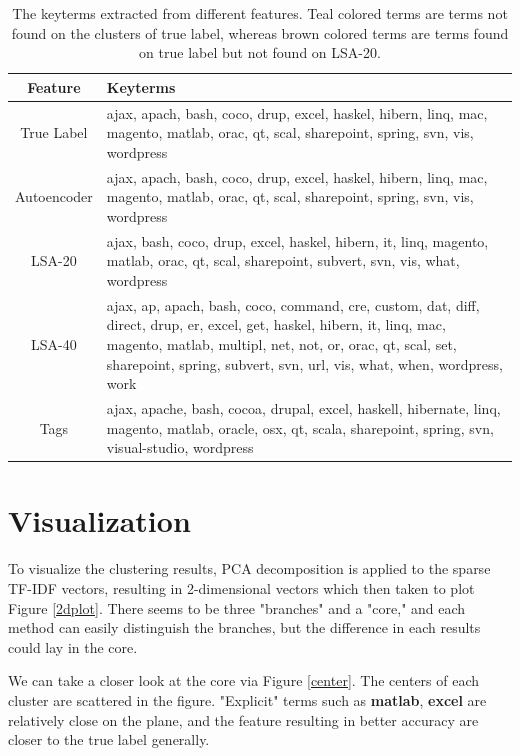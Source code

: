 \documentclass[12pt]{article}
\begin{document}
\begin{table}
  \label{keyterm}
  \noindent
  \newcommand{\diff}[1]{{\color{teal}#1}}
  \newcommand{\diffa}[1]{{\color{brown}#1}}
  \begin{tabular}{cm{}}
    Feature & Keyterms \\
    \hline \hline
    True Label &
    ajax, \diffa{apach}, bash, coco, drup, excel, haskel, hibern,
    linq, \diffa{mac}, magento, matlab, orac, qt, scal, sharepoint,
    \diffa{spring}, svn, vis, wordpress\\
    \hline
    Autoencoder&
    ajax, apach, bash, coco, drup, excel, haskel, hibern,
    linq, mac, magento, matlab, orac, qt, scal, sharepoint,
    spring, svn, vis, wordpress\\
    \hline
    LSA-20&
    ajax, bash, coco, drup, excel, haskel, hibern, \diff{it},
    linq, magento, matlab, orac, qt, scal, sharepoint,
    \diff{subvert}, svn, vis, \diff{what}, wordpress\\
    \hline
    LSA-40&
    ajax, \diff{ap}, apach, bash, coco,
    \diff{command}, \diff{cre}, \diff{custom}, \diff{dat},
    \diff{diff}, \diff{direct}, drup, \diff{er}, excel,
    \diff{get}, haskel, hibern, \diff{it}, linq, mac,
    magento, matlab, \diff{multipl}, \diff{net}, \diff{not},
    \diff{or}, orac, qt, scal, \diff{set}, sharepoint,
    spring, \diff{subvert}, svn, \diff{url}, vis, \diff{what},
    \diff{when}, wordpress, \diff{work}\\
    \space
    \hline \hline
    Tags &
    ajax, apache, bash, cocoa, drupal, excel, haskell, hibernate,
    linq, magento, matlab, oracle, osx, qt, scala, sharepoint,
    spring, svn, visual-studio, wordpress\\
    \hline
  \end{tabular}
  \caption{The keyterms extracted from different features.
  \diff{Teal} colored terms are terms not found on the
  clusters of true label, whereas \diffa{brown} colored
  terms are terms found on true label but not found on LSA-20.}
\end{table}

\section{Visualization}
  \par To visualize the clustering results, PCA decomposition
  is applied to the sparse TF-IDF vectors, resulting in
  2-dimensional vectors which then taken to plot Figure \ref{2dplot}.
  There seems to be three "branches" and a "core," and each
  method can easily distinguish the branches, but the difference
  in each results could lay in the core.
  \par We can take a closer look at the core via Figure \ref{center}.
  The centers of each cluster are scattered in the figure.
  "Explicit" terms such as {\bf matlab}, {\bf excel} are
  relatively close on the plane, and the feature resulting
  in better accuracy are closer to the true label generally.
\end{document}
